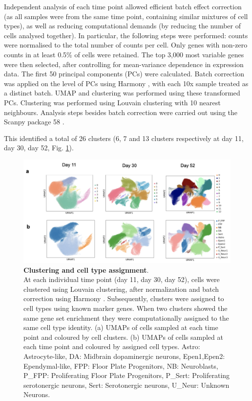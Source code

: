 Independent analysis of each time point allowed efficient batch effect correction (as all samples were from the same time point, containing similar mixtures of cell types), as well as reducing computational demands (by reducing the number of cells analysed together).
In particular, the following steps were performed: counts were normalised to the total number of counts per cell. 
Only genes with non-zero counts in at least 0.5\% of cells were retained. 
The top 3,000 most variable genes were then selected, after controlling for mean-variance dependence in expression data. 
The first 50 principal components (PCs) were calculated. 
Batch correction was applied on the level of PCs using Harmony \cite{korsunsky2019fast}, with each 10x sample treated as a distinct batch. 
UMAP and clustering was performed using these transformed PCs. 
Clustering was performed using Louvain clustering \cite{blondel2008fast} with 10 nearest neighbours. 
Analysis steps besides batch correction were carried out using the Scanpy package 58 \cite{wolf2018scanpy}. 

This identified a total of 26 clusters (6, 7 and 13 clusters respectively at day 11, day 30, day 52, Fig. \ref{fig:neuroseq_clusters}). 

\begin{figure}[h]
\centering
\includegraphics[width=16cm]{Chapter5/Fig/neuroseq_clusters_celltypes.png}
\caption[Clustering and cell type assignment]{\textbf{Clustering and cell type assignment}.\\
At each individual time point (day 11, day 30, day 52), cells were clustered using Louvain clustering, after normalization and batch correction using Harmony \cite{korsunsky2019fast}.
Subsequently, clusters were assigned to cell types using known marker genes. 
When two clusters showed the same gene set enrichment they were computationally assigned to the same cell type identity. 
(a) UMAPs of cells sampled at each time point and coloured by cell clusters. 
(b) UMAPs of cells sampled at each time point and coloured by assigned cell types.
Astro: Astrocyte-like, DA: Midbrain dopaminergic neurons, Epen1,Epen2: Ependymal-like, FPP: Floor Plate Progenitors, NB: Neuroblasts, P\_FPP: Proliferating Floor Plate Progenitors, P\_Sert: Proliferating serotonergic neurons, Sert: Serotonergic neurons, U\_Neur: Unknown Neurons.}
\label{fig:neuroseq_clusters}
\end{figure}

